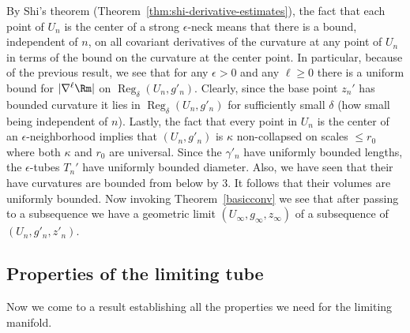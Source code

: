 By Shi's theorem (Theorem~\ref{thm:shi-derivative-estimates}), the fact that each point of
$U_n$ is the center of a strong $\epsilon$-neck means that there is
a bound, independent of $n$, on all covariant derivatives of the
curvature at any point of $U_n$ in terms of the bound on the
curvature at the center point. In particular, because of the
previous result, we see that for any $\epsilon>0$ and any $\ell\ge
0$ there is a uniform bound for $|\nabla^\ell \Rm|$ on
$\operatorname{Reg}_\delta(U_n,g'_n)$. Clearly, since the base point $z_n'$ has
bounded curvature it lies in $\operatorname{Reg}_\delta(U_n,g'_n)$ for
sufficiently small $\delta$ (how small being independent of $n$).
Lastly, the fact that every point in $U_n$ is the center of an
$\epsilon$-neighborhood implies that $(U_n,g'_n)$ is $\kappa$
non-collapsed on scales $\le r_0$ where both $\kappa$ and $r_0$ are
universal. Since the $\gamma'_n$ have uniformly bounded lengths, the
$\epsilon$-tubes $T_n'$ have uniformly bounded diameter. Also, we
have seen that their have curvatures are bounded from below by $3$.
It follows that their volumes are uniformly bounded. Now invoking
Theorem~\ref{basicconv} we see that after passing to a subsequence
we have a geometric limit $(U_\infty,g_\infty,z_\infty)$ of a
subsequence of $(U_n,g'_n,z'_n)$.


\subsection{Properties of the limiting tube}


Now we come to a result establishing all the properties we need for
the limiting manifold.


